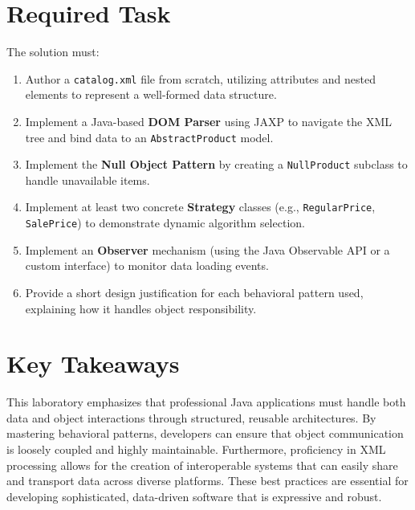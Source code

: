 \documentclass[11pt]{article}
\begin{document}
\section*{Required Task}
The solution must:
\begin{enumerate}
    \item Author a \texttt{catalog.xml} file from scratch, utilizing attributes and nested elements to represent a well-formed data structure.
    \item Implement a Java-based \textbf{DOM Parser} using JAXP to navigate the XML tree and bind data to an \texttt{AbstractProduct} model.
    \item Implement the \textbf{Null Object Pattern} by creating a \texttt{NullProduct} subclass to handle unavailable items.
    \item Implement at least two concrete \textbf{Strategy} classes (e.g., \texttt{RegularPrice}, \texttt{SalePrice}) to demonstrate dynamic algorithm selection.
    \item Implement an \textbf{Observer} mechanism (using the Java Observable API or a custom interface) to monitor data loading events.
    \item Provide a short design justification for each behavioral pattern used, explaining how it handles object responsibility.
\end{enumerate}


\section*{Key Takeaways}

\textcolor{solutionred}{
This laboratory emphasizes that professional Java applications must handle both data and object interactions through structured, reusable architectures. By mastering behavioral patterns, developers can ensure that object communication is loosely coupled and highly maintainable. Furthermore, proficiency in XML processing allows for the creation of interoperable systems that can easily share and transport data across diverse platforms. These best practices are essential for developing sophisticated, data-driven software that is expressive and robust.
}
\end{document}
